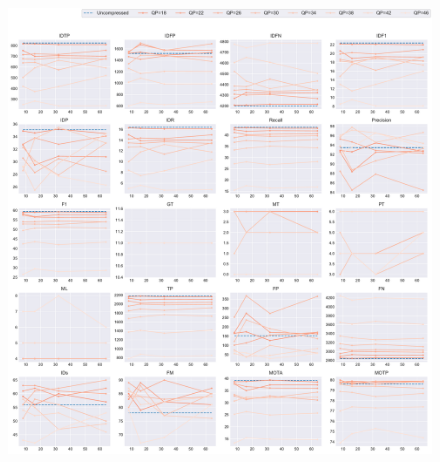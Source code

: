 \begin{figure}[!htbp]
\centering
\includegraphics[width=1.0\linewidth]{img/appendix/BasketballDrill_all_multiplots_msr.pdf}
\caption[Result of all object classes in Class C BasketballDrill with Horizontal Axis of MSR]{}
\label{fig:BasketballDrill_all_msr}
\end{figure}



